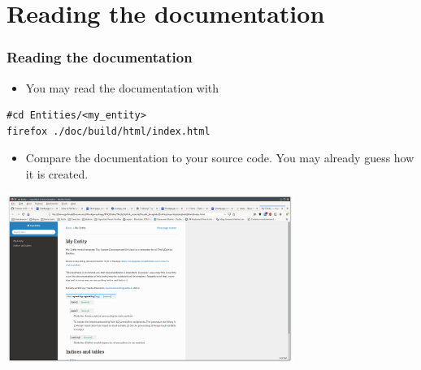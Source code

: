 \documentclass{sdkslides}
\begin{document}
\renewcommand{\sectionname}{Reading the documentation}
\section*{\sectionname}
\begin{frame}[t,fragile]
    \frametitle{\sectionname} 
    \begin{itemize}
        \item You may read the documentation with
    \end{itemize}
\begin{lstlisting}
#cd Entities/<my_entity>
firefox ./doc/build/html/index.html
\end{lstlisting}
    \begin{itemize}
        \item Compare the documentation to your source code. You may already
            guess how it is created.
    \end{itemize}
    \begin{center}
        \includegraphics[width=0.7\textwidth]{./Pics/Documentation.png}
    \end{center}
\end{frame}


\renewcommand{\sectionname}{Production version}
\end{document}
